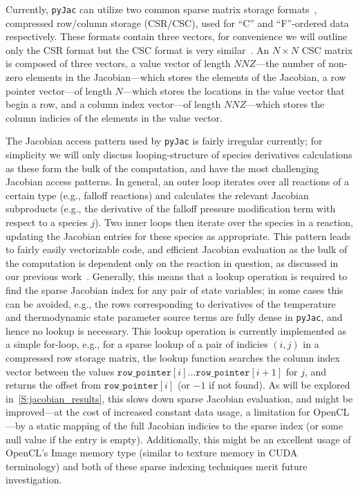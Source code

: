 \documentclass[12pt,number,sort&compress,preprint]{elsarticle}
\begin{document}
Currently, \texttt{pyJac} can utilize two common sparse matrix storage formats~\cite{netlib_templates}, compressed row\slash column storage (CSR\slash CSC), used for ``C'' and ``F''-ordered data respectively.
These formats contain three vectors, for convenience we will outline only the CSR format but the CSC format is very similar~\cite{netlib_templates}.
An $N\times N$ CSC matrix is composed of three vectors, a value vector of length $NNZ$---the number of non-zero elements in the Jacobian---which stores the elements of the Jacobian, a row pointer vector---of length $N$---which stores the locations in the value vector that begin a row, and a column index vector---of length $NNZ$---which stores the column indicies of the elements in the value vector.

The Jacobian access pattern used by \texttt{pyJac} is fairly irregular currently; for simplicity we will only discuss looping-structure of species derivatives calculations as these form the bulk of the computation, and have the most challenging Jacobian access patterns.
In general, an outer loop iterates over all reactions of a certain type (e.g., falloff reactions) and calculates the relevant Jacobian subproducts (e.g., the derivative of the falloff pressure modification term with respect to a species $j$).
Two inner loops then iterate over the species in a reaction, updating the Jacobian entries for these species as appropriate.
This pattern leads to fairly easily vectorizable code, and efficient Jacobian evaluation as the bulk of the computation is dependent only on the reaction in question, as discussed in our previous work~\cite{Niemeyer:2016aa}.
Generally, this means that a lookup operation is required to find the sparse Jacobian index for any pair of state variables; in some cases this can be avoided, e.g., the rows corresponding to derivatives of the temperature and thermodynamic state parameter source terms are fully dense in \texttt{pyJac}, and hence no lookup is necessary.
This lookup operation is currently implemented as a simple for-loop, e.g., for a sparse lookup of a pair of indicies $(i, j)$ in a compressed row storage matrix, the lookup function searches the column index vector between the values $\texttt{row\_pointer}[i] \ldots \texttt{row\_pointer}[i + 1]$ for $j$, and returns the offset from $\texttt{row\_pointer}[i]$ (or $\num{-1}$ if not found).
As will be explored in~\cref{S:jacobian_results}, this slows down sparse Jacobian evaluation, and might be improved---at the cost of increased constant data usage, a limitation for OpenCL---by a static mapping of the full Jacobian indicies to the sparse index (or some null value if the entry is empty).
Additionally, this might be an excellent usage of OpenCL's Image memory type (similar to texture memory in CUDA terminology) and both of these sparse indexing techniques merit future investigation.
\end{document}
